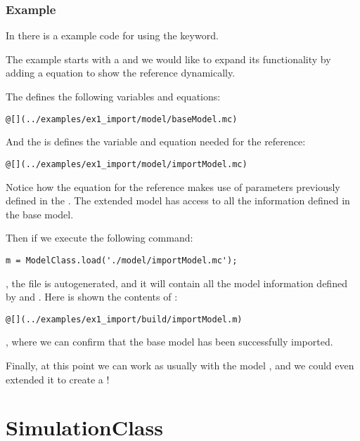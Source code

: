 \documentclass[11pt]{article}
\begin{document}
\subsubsection{Example}

In  there is a example code for using the  keyword.

The example starts with a  and we would like to expand its functionality by adding a equation to show the reference dynamically.

The  defines the following variables and equations:

\begin{lstlisting}
@[](../examples/ex1_import/model/baseModel.mc)
\end{lstlisting}

And the  is defines the variable and equation needed for the reference:

\begin{lstlisting}
@[](../examples/ex1_import/model/importModel.mc)
\end{lstlisting}

Notice how the equation for the reference  makes use of parameters previously defined in the . The extended model has access to all the information defined in the base model.

Then if we execute the following command:

\begin{lstlisting}
m = ModelClass.load('./model/importModel.mc');
\end{lstlisting}

, the file  is autogenerated, and it will contain all the model information defined by  and . Here is shown the contents of :

\begin{lstlisting}
@[](../examples/ex1_import/build/importModel.m)
\end{lstlisting}

, where we can confirm that the base model has been successfully imported.

Finally, at this point we can work as usually with the model , and we could even extended it to create a !

\section{SimulationClass}
\end{document}
